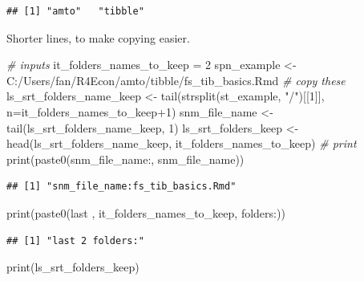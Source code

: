 \documentclass[
]{book}
\newenvironment{Shaded}{\begin{snugshade}}{\end{snugshade}}
\newcommand{\AttributeTok}[1]{\textcolor[rgb]{0.77,0.63,0.00}{#1}}
\newcommand{\CommentTok}[1]{\textcolor[rgb]{0.56,0.35,0.01}{\textit{#1}}}
\newcommand{\DecValTok}[1]{\textcolor[rgb]{0.00,0.00,0.81}{#1}}
\newcommand{\FunctionTok}[1]{\textcolor[rgb]{0.00,0.00,0.00}{#1}}
\newcommand{\NormalTok}[1]{#1}
\newcommand{\OtherTok}[1]{\textcolor[rgb]{0.56,0.35,0.01}{#1}}
\newcommand{\SpecialCharTok}[1]{\textcolor[rgb]{0.00,0.00,0.00}{#1}}
\newcommand{\StringTok}[1]{\textcolor[rgb]{0.31,0.60,0.02}{#1}}
\begin{document}
\begin{verbatim}
## [1] "amto"   "tibble"
\end{verbatim}

Shorter lines, to make copying easier.

\begin{Shaded}
\begin{Highlighting}[]
\CommentTok{\# inputs}
\NormalTok{it\_folders\_names\_to\_keep }\OtherTok{=} \DecValTok{2}
\NormalTok{spn\_example }\OtherTok{\textless{}{-}} \StringTok{\textquotesingle{}C:/Users/fan/R4Econ/amto/tibble/fs\_tib\_basics.Rmd\textquotesingle{}}
\CommentTok{\# copy these}
\NormalTok{ls\_srt\_folders\_name\_keep }\OtherTok{\textless{}{-}} \FunctionTok{tail}\NormalTok{(}\FunctionTok{strsplit}\NormalTok{(st\_example, }\StringTok{"/"}\NormalTok{)[[}\DecValTok{1}\NormalTok{]], }\AttributeTok{n=}\NormalTok{it\_folders\_names\_to\_keep}\SpecialCharTok{+}\DecValTok{1}\NormalTok{)}
\NormalTok{snm\_file\_name }\OtherTok{\textless{}{-}} \FunctionTok{tail}\NormalTok{(ls\_srt\_folders\_name\_keep, }\DecValTok{1}\NormalTok{)}
\NormalTok{ls\_srt\_folders\_keep }\OtherTok{\textless{}{-}} \FunctionTok{head}\NormalTok{(ls\_srt\_folders\_name\_keep, it\_folders\_names\_to\_keep)}
\CommentTok{\# print}
\FunctionTok{print}\NormalTok{(}\FunctionTok{paste0}\NormalTok{(}\StringTok{\textquotesingle{}snm\_file\_name:\textquotesingle{}}\NormalTok{, snm\_file\_name))}
\end{Highlighting}
\end{Shaded}

\begin{verbatim}
## [1] "snm_file_name:fs_tib_basics.Rmd"
\end{verbatim}

\begin{Shaded}
\begin{Highlighting}[]
\FunctionTok{print}\NormalTok{(}\FunctionTok{paste0}\NormalTok{(}\StringTok{\textquotesingle{}last \textquotesingle{}}\NormalTok{, it\_folders\_names\_to\_keep, }\StringTok{\textquotesingle{} folders:\textquotesingle{}}\NormalTok{))}
\end{Highlighting}
\end{Shaded}

\begin{verbatim}
## [1] "last 2 folders:"
\end{verbatim}

\begin{Shaded}
\begin{Highlighting}[]
\FunctionTok{print}\NormalTok{(ls\_srt\_folders\_keep)}
\end{Highlighting}
\end{Shaded}
\end{document}
